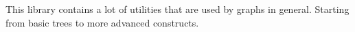 This library contains a lot of utilities that are used by graphs in general. Starting from basic trees to more advanced constructs. 